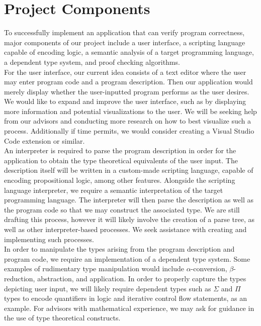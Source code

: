 \documentclass[ 12pt ]{article}
\begin{document}
\section*{Project Components}

\qquad To successfully implement an application that can verify program correctness, major components of our project include a user interface, a scripting language capable of encoding logic, a semantic analysis of a target programming language, a dependent type system, and proof checking algorithms. \\

\noindent \qquad For the user interface, our current idea consists of a text editor where the user may enter program code and a program description. Then our application would merely display whether the user-inputted program performs as the user desires. We would like to expand and improve the user interface, such as by displaying more information and potential visualizations to the user. We will be seeking help from our advisors and conducting more research on how to best visualize such a process. Additionally if time permits, we would consider creating a Visual Studio Code extension or similar. \\

\noindent \qquad An  interpreter is required to parse the program description in order for the application to obtain the type theoretical equivalents of the user input. The description itself will be written in a custom-made scripting language, capable of encoding propositional logic, among other features. Alongside the scripting language interpreter, we require a semantic interpretation of the target programming language. The interpreter will then parse the description as well as the program code so that we may construct the associated type. We are still drafting this process, however it will likely involve the creation of a parse tree, as well as other interpreter-based processes. We seek assistance with creating and implementing such processes.  \\

\noindent \qquad In order to manipulate the types arising from the program description and program code, we require an implementation of a dependent type system. Some examples of rudimentary type manipulation would include $\alpha$-conversion, $\beta$-reduction, abstraction, and application. In order to properly capture the types depicting user input, we will likely require dependent types such as $\Sigma$ and $\Pi$ types to encode quantifiers in logic and iterative control flow statements, as an example. For advisors with mathematical experience, we may ask for guidance in the use of type theoretical constructs. \\
\end{document}
